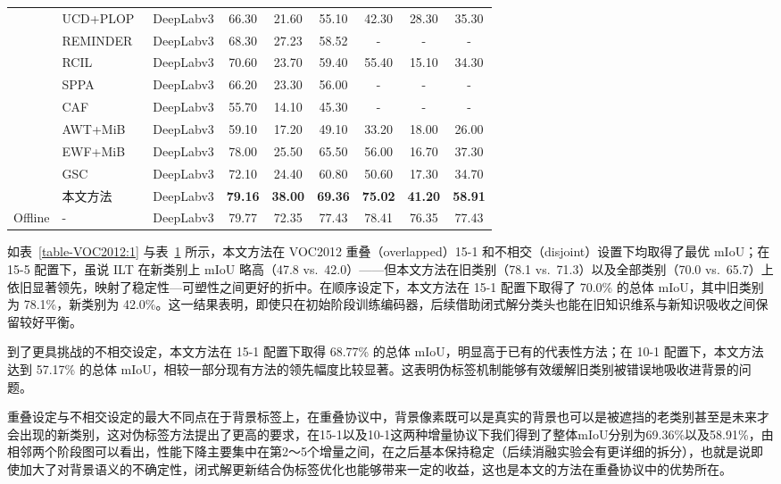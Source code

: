 \begin{table}[!htbp]
\begin{tabular}{@{}llcccc ccc@{}}
                        &UCD+PLOP~\citep{UCD}&DeepLabv3&66.30&21.60&55.10&42.30&28.30&35.30\\
                        &REMINDER~\citep{REMINDER} &DeepLabv3&68.30&27.23&58.52&-&-&- \\
                        &RCIL~\citep{RCIL}&DeepLabv3&70.60&23.70&59.40&55.40&15.10&34.30\\
                        &SPPA~\citep{SPPA}&DeepLabv3&66.20&23.30&56.00&-&-&-\\
                        &CAF~\citep{CAF}&DeepLabv3&55.70&14.10&45.30&-&-&-\\
                        &AWT+MiB~\citep{AWT}&DeepLabv3 &59.10&17.20&49.10&33.20&18.00&26.00\\
                        &EWF+MiB~\citep{EWF}&DeepLabv3&78.00&25.50&65.50&56.00&16.70&37.30\\
                        &GSC~\citep{GSC}&DeepLabv3&72.10&24.40&60.80&50.60&17.30&34.70 \\
                    &本文方法&DeepLabv3&\textbf{79.16}&\textbf{38.00}&\textbf{69.36}&\textbf{75.02}&\textbf{41.20}&\textbf{58.91} \\
                        \midrule
                        Offline & - & DeepLabv3&79.77&72.35&77.43&78.41&76.35&77.43\\
                        \bottomrule[0.8pt]
            \end{tabular}

    \label{table-VOC2012:2}
\end{table}

如表~\ref{table-VOC2012:1} 与表~\ref{table-VOC2012:2} 所示，本文方法在 VOC2012 重叠（overlapped）15-1 和不相交（disjoint）设置下均取得了最优 mIoU；在 15-5 配置下，虽说 ILT 在新类别上 mIoU 略高（47.8 vs.~42.0）——但本文方法在旧类别（78.1 vs.~71.3）以及全部类别（70.0 vs.~65.7）上依旧显著领先，映射了稳定性—可塑性之间更好的折中。在顺序设定下，本文方法在 15-1 配置下取得了 70.0\% 的总体 mIoU，其中旧类别为 78.1\%，新类别为 42.0\%。这一结果表明，即使只在初始阶段训练编码器，后续借助闭式解分类头也能在旧知识维系与新知识吸收之间保留较好平衡。

到了更具挑战的不相交设定，本文方法在 15-1 配置下取得 68.77\% 的总体 mIoU，明显高于已有的代表性方法；在 10-1 配置下，本文方法达到 57.17\% 的总体 mIoU，相较一部分现有方法的领先幅度比较显著。这表明伪标签机制能够有效缓解旧类别被错误地吸收进背景的问题。

重叠设定与不相交设定的最大不同点在于背景标签上，在重叠协议中，背景像素既可以是真实的背景也可以是被遮挡的老类别甚至是未来才会出现的新类别，这对伪标签方法提出了更高的要求，在15-1以及10-1这两种增量协议下我们得到了整体mIoU分别为69.36\%以及58.91\%，由相邻两个阶段图可以看出，性能下降主要集中在第2～5个增量之间，在之后基本保持稳定（后续消融实验会有更详细的拆分），也就是说即使加大了对背景语义的不确定性，闭式解更新结合伪标签优化也能够带来一定的收益，这也是本文的方法在重叠协议中的优势所在。

